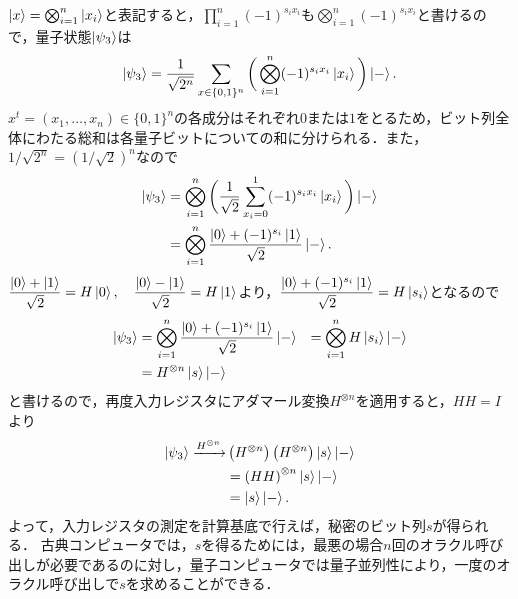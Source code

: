 $\ket{x} = \bigotimes_{i=1}^n \ket{x_i}$と表記すると，$\prod_{i=1}^n (-1)^{s_i x_i}$も$\bigotimes_{i=1}^n (-1)^{s_i x_i}$と書けるので，量子状態$\ket{\psi_3}$は
\begin{align*}
    \ket{\psi_3} 
    = \frac{1}{\sqrt{2^n}}\sum_{x\in\{0,1\}^n} \bigg( \bigotimes_{i=1}^n (-1)^{s_i x_i} \ket{x_i} \bigg) \ket{-}.
\end{align*}
$x^t=(x_1,\ldots,x_n) \in \{0,1\}^n$の各成分はそれぞれ$0$または$1$をとるため，ビット列全体にわたる総和は各量子ビットについての和に分けられる．また，$1/\sqrt{2^n}=(1/\sqrt{2})^n$なので
\begin{align*}
    \ket{\psi_3} 
    &= \bigotimes_{i=1}^n \bigg( \frac{1}{\sqrt{2}} \sum_{x_i = 0}^{1} (-1)^{s_i x_i} \ket{x_i} \bigg) \ket{-} \\
    &= \bigotimes_{i=1}^n \dfrac{\ket{0} + (-1)^{s_i} \ket{1}}{\sqrt{2}} \ket{-}.
\end{align*}
$\dfrac{\ket{0} + \ket{1}}{\sqrt{2}} = H\ket{0}, \quad \dfrac{\ket{0} - \ket{1}}{\sqrt{2}} = H\ket{1}$より，$\dfrac{\ket{0} + (-1)^{s_i} \ket{1}}{\sqrt{2}} = H\ket{s_i}$となるので
\begin{align*}
    \ket{\psi_3}
    &=\bigotimes_{i=1}^n \dfrac{\ket{0} + (-1)^{s_i} \ket{1}}{\sqrt{2}} \ket{-} 
    &= \bigotimes_{i=1}^n H\ket{s_i} \ket{-} \\
    &= H^{\otimes n} \ket{s} \ket{-}
\end{align*}
と書けるので，再度入力レジスタにアダマール変換$H^{\otimes n}$を適用すると，$HH = I$より
\begin{align*}
    \ket{\psi_3}\xrightarrow{H^{\otimes n}} 
    &\left(H^{\otimes n}\right) \left(H^{\otimes n}\right) \ket{s} \ket{-} \\
    &= \left(HH\right)^{\otimes n} \ket{s} \ket{-} \\
    &= \ket{s} \ket{-}.
\end{align*}
よって，入力レジスタの測定を計算基底で行えば，秘密のビット列$s$が得られる．
古典コンピュータでは，$s$を得るためには，最悪の場合$n$回のオラクル呼び出しが必要であるのに対し，量子コンピュータでは量子並列性により，一度のオラクル呼び出しで$s$を求めることができる．
\newpage

